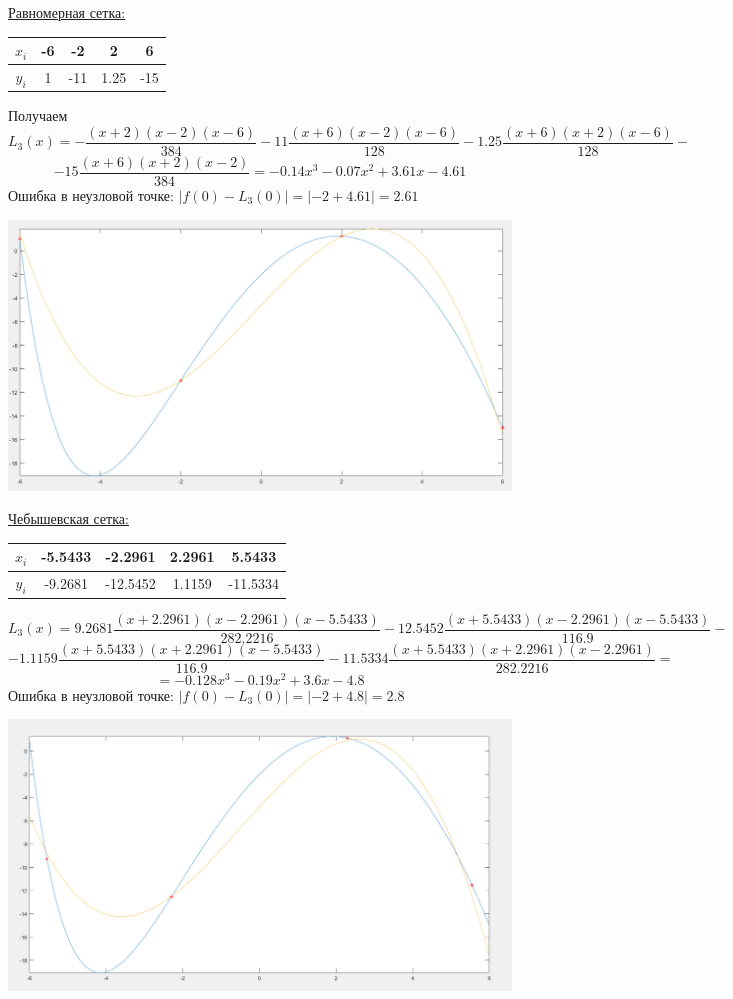 \documentclass{article}
\begin{document}
	\underline{Равномерная сетка:}
	\begin{center}
		\begin{tabular}{|c|c|c|c|c|}
		\hline
			$x_i$ & -6 & -2 & 2 & 6 \\ \hline
			$y_i$ & 1 & -11 & 1.25 & -15 \\ 
		\hline
		\end{tabular}
	\end{center}
	Получаем 
		$$L_3(x) = -\frac{(x+2)(x-2)(x-6)}{384} - 11\frac{(x+6)(x-2)(x-6)}{128} - 1.25\frac{(x+6)(x+2)(x-6)}{128} -$$ $$-
		15\frac{(x+6)(x+2)(x-2)}{384} = -0.14x^3 - 0.07x^2 + 3.61x - 4.61$$
	Ошибка в неузловой точке: $|f(0) - L_3(0)| = |-2 + 4.61| = 2.61$
	\begin{center}
		\includegraphics[scale = 0.4]{Тестовый пример}
	\end{center}
	\underline{Чебышевская сетка:}
	\begin{center}
		\begin{tabular}{|c|c|c|c|c|}
			\hline
			$x_i$ & -5.5433 & -2.2961 & 2.2961 & 5.5433 \\ \hline
			$y_i$ & -9.2681 & -12.5452 & 1.1159 & -11.5334 \\ 
			\hline
		\end{tabular}
	\end{center} 
	$$L_3(x) = 9.2681\frac{(x+2.2961)(x-2.2961)(x-5.5433)}{282.2216} - 12.5452\frac{(x+5.5433)(x-2.2961)(x-5.5433)}{116.9}-$$ $$  -1.1159\frac{(x+5.5433)(x+2.2961)(x-5.5433)}{116.9} -
	11.5334\frac{(x+5.5433)(x+2.2961)(x-2.2961)}{282.2216} = $$ $$= -0.128x^3 - 0.19x^2 + 3.6x - 4.8$$
	Ошибка в неузловой точке: $|f(0) - L_3(0)| = |-2 + 4.8| = 2.8$
	\begin{center}
		\includegraphics[scale = 0.4]{Тестовый пример Чебышев}
	\end{center}
\end{document}
